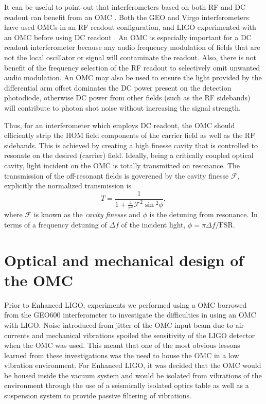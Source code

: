 It can be useful to point out that interferometers based on both RF and DC readout can benefit from an OMC . %
Both the GEO and Virgo interferometers have used OMCs in an RF readout configuration, and LIGO experimented with an OMC before using DC readout \cite{some things}. %
An OMC is especially important for a DC readout interferometer because any audio frequency modulation of fields that are not the local oscillator or signal will contaminate the readout. %
Also, there is not benefit of the frequency selection of the RF readout to selectively omit unwanted audio modulation. %
An OMC may also be used to ensure the light provided by the differential arm offset dominates the DC power present on the detection photodiode, otherwise DC power from other fields (such as the RF sidebands) will contribute to photon shot noise without increasing the signal strength. %


Thus, for an interferometer which employs DC readout, the OMC should efficiently strip the HOM field components of the carrier field as well as the RF sidebands. %
This is achieved by creating a high finesse cavity that is controlled to resonate on the desired (carrier) field. %
Ideally, being a critically coupled optical cavity, light incident on the OMC is totally transmitted on resonance. %
The transmission of the off-resonant fields is goverened by the cavity finesse $\mathcal{F}$, explicitly the normalized transmission is
\begin{equation}
\label{eqn:finesse}
T=\frac{1}{1+\frac{4}{\pi^2}\mathcal{F}^2\sin{}^2\phi},
\end{equation}
where $\mathcal{F}$ is known as the \emph{cavity finesse} and $\phi$ is the detuning from resonance. %
In terms of a frequency detuning of $\Delta f$ of the incident light, $\phi = \pi \Delta f / \mathrm{FSR}$.

\section{Optical and mechanical design of the OMC}
Prior to Enhanced LIGO, experiments we performed using a OMC borrowed from the GEO600 interferometer to investigate the difficulties in using an OMC with LIGO. %
Noise introduced from jitter of the OMC input beam due to air currents and mechanical vibrations spoiled the sensitivity of the LIGO detector when the OMC was used. %
This meant that one of the most obvious lessons learned from these investigations was the need to house the OMC in a low vibration environment. %
For Enhanced LIGO, it was decided that the OMC would be housed inside the vacuum system and would be isolated from vibrations of the environment through the use of a seismically isolated optics table as well as a suspension system to provide passive filtering of vibrations.

